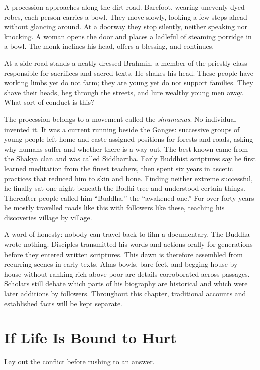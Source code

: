 A procession approaches along the dirt road. Barefoot, wearing unevenly dyed robes, each person carries a bowl. They move slowly, looking a few steps ahead without glancing around. At a doorway they stop silently, neither speaking nor knocking. A woman opens the door and places a ladleful of steaming porridge in a bowl. The monk inclines his head, offers a blessing, and continues.

At a side road stands a neatly dressed Brahmin, a member of the priestly class responsible for sacrifices and sacred texts. He shakes his head. These people have working limbs yet do not farm; they are young yet do not support families. They shave their heads, beg through the streets, and lure wealthy young men away. What sort of conduct is this?

The procession belongs to a movement called the \textit{shramanas}. No individual invented it. It was a current running beside the Ganges: successive groups of young people left home and caste-assigned positions for forests and roads, asking why humans suffer and whether there is a way out. The best known came from the Shakya clan and was called Siddhartha. Early Buddhist scriptures say he first learned meditation from the finest teachers, then spent six years in ascetic practices that reduced him to skin and bone. Finding neither extreme successful, he finally sat one night beneath the Bodhi tree and understood certain things. Thereafter people called him ``Buddha,'' the ``awakened one.'' For over forty years he mostly travelled roads like this with followers like these, teaching his discoveries village by village.

A word of honesty: nobody can travel back to film a documentary. The Buddha wrote nothing. Disciples transmitted his words and actions orally for generations before they entered written scriptures. This dawn is therefore assembled from recurring scenes in early texts. Alms bowls, bare feet, and begging house by house without ranking rich above poor are details corroborated across passages. Scholars still debate which parts of his biography are historical and which were later additions by followers. Throughout this chapter, traditional accounts and established facts will be kept separate.

\section{If Life Is Bound to Hurt}
Lay out the conflict before rushing to an answer.

